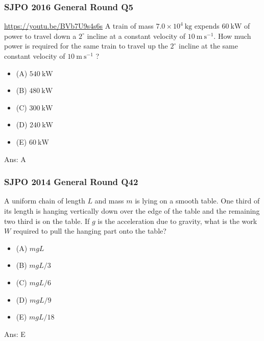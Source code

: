 \documentclass{article}
\begin{document}
\subsubsection{SJPO 2016 General Round Q5}
\url{https://youtu.be/BVb7U9s4s6s}
A train of mass $7.0 \times 10^4 \mathrm{~kg}$ expends $60 \mathrm{~kW}$ of power to travel down a $2^{\circ}$ incline at a constant velocity of $10 \mathrm{~m} \mathrm{~s}^{-1}$. How much power is required for the same train to travel up the $2^{\circ}$ incline at the same constant velocity of $10 \mathrm{~m} \mathrm{~s}^{-1}$ ?
\begin{itemize}
\item[] (A) $540 \mathrm{~kW}$
\item[] (B) $480 \mathrm{~kW}$
\item[] (C) $300 \mathrm{~kW}$
\item[] (D) $240 \mathrm{~kW}$
\item[] (E) $60 \mathrm{~kW}$
\end{itemize}
Ans:  \ifpaper A \fi

\subsubsection{SJPO 2014 General Round Q42}
A uniform chain of length $L$ and mass $m$ is lying on a smooth table. One third of its length is hanging vertically down over the edge of the table and the remaining two third is on the table. If $g$ is the acceleration due to gravity, what is the work $W$ required to pull the hanging part onto the table?
\begin{itemize}
\item[] (A) $m g L$
\item[] (B) $m g L / 3$
\item[] (C) $m g L / 6$
\item[] (D) $m g L / 9$
\item[] (E) $m g L / 18$
\end{itemize}
Ans: \ifpaper E \fi

\newpage \clearpage
\end{document}
